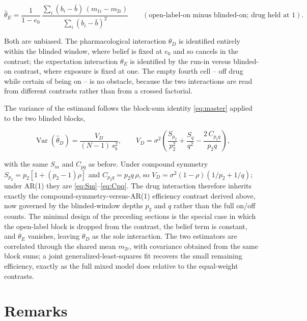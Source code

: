 \documentclass[
  11pt,
]{article}
\begin{document}
\begin{equation}
\hat\theta_E
  = \frac{1}{1 - e_0}\,
    \frac{\sum_i (b_i - \bar b)\,(m_{1i} - m_{2i})}
         {\sum_i (b_i - \bar b)^2}
\qquad (\text{open-label-on minus blinded-on; drug held at } 1).
\label{eq:thetaE}
\end{equation}

Both are unbiased. The pharmacological interaction \(\theta_D\) is
identified entirely within the blinded window, where belief is fixed
at \(e_0\) and so cancels in the contrast; the expectation interaction
\(\theta_E\) is identified by the run-in versus blinded-on contrast,
where exposure is fixed at one. The empty fourth cell -- off drug
while certain of being on -- is no obstacle, because the two
interactions are read from different contrasts rather than from a
crossed factorial.

The variance of the estimand follows the block-sum identity
\eqref{eq:master} applied to the two blinded blocks,

\begin{equation}
\operatorname{Var}(\hat\theta_D) = \frac{V_D}{(N-1)\, s_b^2},
\qquad
V_D = \sigma^2\!\left(\frac{S_{p_2}}{p_2^2} + \frac{S_q}{q^2}
       - \frac{2\, C_{p_2 q}}{p_2 q}\right),
\label{eq:VD}
\end{equation}

with the same \(S_m\) and \(C_{pq}\) as before. Under compound symmetry
\(S_{p_2} = p_2[1 + (p_2 - 1)\rho]\) and \(C_{p_2 q} = p_2 q\,\rho\), so
\(V_D = \sigma^2 (1-\rho)(1/p_2 + 1/q)\); under AR(1) they are
\eqref{eq:Sm}--\eqref{eq:Cpq}. The drug interaction therefore inherits
exactly the compound-symmetry-versus-AR(1) efficiency contrast derived
above, now governed by the blinded-window depths \(p_2\) and \(q\) rather
than the full on/off counts. The minimal design of the preceding
sections is the special case in which the open-label block is dropped
from the contrast, the belief term is constant, and \(\theta_E\)
vanishes, leaving \(\theta_D\) as the sole interaction. The two
estimators are correlated through the shared mean \(m_{2i}\), with
covariance obtained from the same block sums; a joint
generalized-least-squares fit recovers the small remaining efficiency,
exactly as the full mixed model does relative to the equal-weight
contrasts.

\section{Remarks}\label{remarks}
\end{document}
